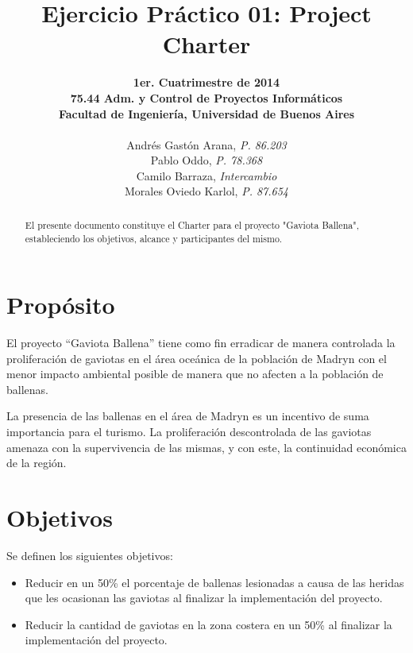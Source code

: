 \documentclass[a4paper,11pt]{article}
\title{\textbf{Ejercicio Práctico 01: Project Charter}}
\author{
  \normalsize{\textbf{1er. Cuatrimestre de 2014}} \\
  \normalsize{\textbf{75.44 Adm. y Control de Proyectos Informáticos}} \\
  \normalsize{\textbf{Facultad de Ingeniería, Universidad de Buenos Aires}} \\
  \\
  Andrés Gastón Arana, \textit{P. 86.203} \\
  Pablo Oddo, \textit{P. 78.368} \\
  Camilo Barraza, \textit{Intercambio} \\
  Morales Oviedo Karlol, \textit{P. 87.654} \\
}
\date{}
\begin{document}
\thispagestyle{empty}
\maketitle

\begin{abstract}

  El presente documento constituye el Charter para el proyecto "Gaviota
  Ballena", estableciendo los objetivos, alcance y participantes del mismo.

\end{abstract}

\clearpage

\tableofcontents
\clearpage


\section{Propósito}

El proyecto “Gaviota Ballena” tiene como fin erradicar de manera controlada la
proliferación de gaviotas en el área oceánica de la población de Madryn con el
menor impacto ambiental posible de manera que no afecten a la población de
ballenas.

La presencia de las ballenas en el área de Madryn es un incentivo de suma
importancia para el turismo. La proliferación descontrolada de las gaviotas
amenaza con la supervivencia de las mismas, y con este, la continuidad
económica de la región.

\section{Objetivos}

Se definen los siguientes objetivos:

\begin{itemize}

  \item Reducir en un 50\% el porcentaje de ballenas lesionadas a causa de las
    heridas que les ocasionan las gaviotas al finalizar la implementación del
    proyecto.

  \item Reducir la cantidad de gaviotas en la zona costera en un 50\% al
    finalizar la implementación del proyecto.

\end{itemize}
\end{document}
